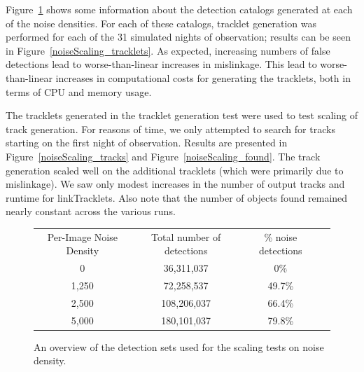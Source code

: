 Figure~\ref{noiseScaling_detections} shows some information about the
detection catalogs generated at each of the noise densities.  For each
of these catalogs, tracklet generation was performed for each of the
31 simulated nights of observation; results can be seen in
Figure~\ref{noiseScaling_tracklets}.  As expected, increasing numbers
of false detections lead to worse-than-linear increases in mislinkage.
This lead to worse-than-linear increases in computational costs for generating the
tracklets, both in terms of CPU and memory usage.

The tracklets generated in the tracklet generation test were used to
test scaling of track generation.  For reasons of time, we only
attempted to search for tracks starting on the first night of
observation.  Results are presented in
Figure~\ref{noiseScaling_tracks} and Figure~\ref{noiseScaling_found}.
The track generation scaled well on the additional tracklets (which
were primarily due to mislinkage).  We saw only modest increases in
the number of output tracks and runtime for linkTracklets.  Also note
that the number of objects found remained nearly constant across the
various runs.  



\begin{figure}[ht!]
\centering

\begin{tabular}{|c c c c|}
\hline
Per-Image Noise Density & Total number of detections & \% noise detections &  \\ 
0             & 36,311,037             & 0\%                          & \\
1,250         & 72,258,537             & 49.7\%          & \\
2,500         & 108,206,037            & 66.4\%          & \\ 
5,000         & 180,101,037            & 79.8\%          & \\
\hline
\end{tabular}
\caption{An overview of the detection sets used for the scaling tests on noise density.}
\label{noiseScaling_detections}
\end{figure}

